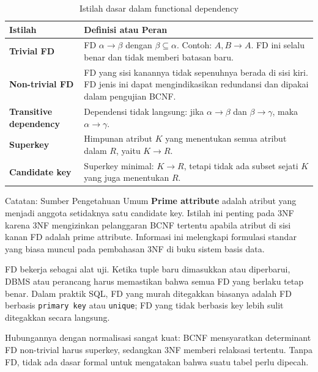 \begin{table}[H]
\centering
\begin{tabularx}{\textwidth}{|L{0.28\textwidth}|X|}
\hline
\textbf{Istilah} & \textbf{Definisi atau Peran} \\
\hline
\textbf{Trivial FD} & FD \(\alpha \rightarrow \beta\) dengan \(\beta \subseteq \alpha\). Contoh: \(A,B \rightarrow A\). FD ini selalu benar dan tidak memberi batasan baru. \\
\hline
\textbf{Non-trivial FD} & FD yang sisi kanannya tidak sepenuhnya berada di sisi kiri. FD jenis ini dapat mengindikasikan redundansi dan dipakai dalam pengujian BCNF. \\
\hline
\textbf{Transitive dependency} & Dependensi tidak langsung: jika \(\alpha \rightarrow \beta\) dan \(\beta \rightarrow \gamma\), maka \(\alpha \rightarrow \gamma\). \\
\hline
\textbf{Superkey} & Himpunan atribut \(K\) yang menentukan semua atribut dalam \(R\), yaitu \(K \rightarrow R\). \\
\hline
\textbf{Candidate key} & Superkey minimal: \(K \rightarrow R\), tetapi tidak ada subset sejati \(K\) yang juga menentukan \(R\). \\
\hline
\end{tabularx}
\caption{Istilah dasar dalam functional dependency}
\label{tab:istilah-fd}
\end{table}

\begin{cmt}{Catatan: Sumber Pengetahuan Umum}{}
\textbf{Prime attribute} adalah atribut yang menjadi anggota setidaknya satu candidate key. Istilah ini penting pada 3NF karena 3NF mengizinkan pelanggaran BCNF tertentu apabila atribut di sisi kanan FD adalah prime attribute. Informasi ini melengkapi formulasi standar yang biasa muncul pada pembahasan 3NF di buku sistem basis data.
\end{cmt}

FD bekerja sebagai alat uji. Ketika tuple baru dimasukkan atau diperbarui, DBMS atau perancang harus memastikan bahwa semua FD yang berlaku tetap benar. Dalam praktik SQL, FD yang murah ditegakkan biasanya adalah FD berbasis \texttt{primary key} atau \texttt{unique}; FD yang tidak berbasis key lebih sulit ditegakkan secara langsung.

Hubungannya dengan normalisasi sangat kuat: BCNF mensyaratkan determinant FD non-trivial harus superkey, sedangkan 3NF memberi relaksasi tertentu. Tanpa FD, tidak ada dasar formal untuk mengatakan bahwa suatu tabel perlu dipecah.

